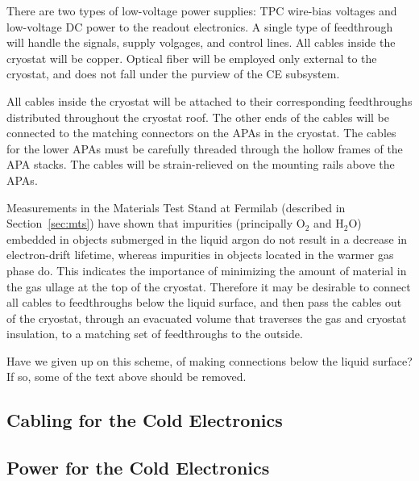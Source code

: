 There are two types of low-voltage power supplies:
TPC wire-bias voltages and low-voltage DC power to the readout electronics.
A single type of feedthrough will handle the signals, supply volgages, and control lines.
All cables inside the cryostat will be copper.
Optical fiber will be employed only external to the cryostat, and does not fall under the purview of the CE subsystem.

All cables inside the cryostat will be attached to their corresponding feedthroughs distributed throughout the cryostat roof.
The other ends of the cables will be connected to the matching connectors on the APAs in the cryostat.
The cables for the lower APAs must be carefully threaded through the hollow frames of the APA stacks.
The cables will be strain-relieved on the  mounting rails above the APAs. 

Measurements in the Materials Test Stand at Fermilab (described in Section~\ref{sec:mts})
have shown that impurities (principally O$_2$ and H$_2$O) embedded in objects submerged in the liquid argon do not result
in a decrease in electron-drift lifetime, whereas impurities in objects located in the warmer gas phase do.
This indicates the importance of minimizing the amount of material in the gas ullage at the top of the cryostat.
Therefore it may be desirable to connect all cables to feedthroughs below the liquid surface,
and then pass the cables out of the cryostat, through an evacuated volume that traverses the gas and cryostat insulation,
to a matching set of feedthroughs to the outside. 

\begin{editornote}
  Have we given up on this scheme, of making connections below the liquid surface?
  If so, some of the text above should be removed.
\end{editornote}

%
\subsection{Cabling for the Cold Electronics }
\label{subsec:ce-feedthrough-cable}

%
\subsection{Power for the Cold Electronics }
\label{subsec:ce-feedthrough-power}

